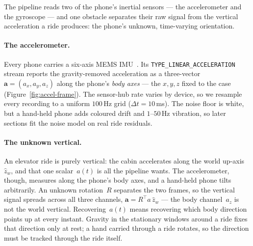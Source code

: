 \documentclass[manuscript,review,screen]{acmart}
\begin{document}
The pipeline reads two of the phone's inertial sensors --- the
accelerometer and the gyroscope --- and one obstacle separates their
raw signal from the vertical acceleration a ride produces: the phone's
unknown, time-varying orientation.

\paragraph{The accelerometer.}
Every phone carries a six-axis MEMS IMU~\cite{beeby2004mems}.  Its
\texttt{TYPE\_LINEAR\_ACCELERATION} stream reports the
gravity-removed acceleration as a three-vector
$\mathbf{a}=(a_x,a_y,a_z)$ along the phone's \emph{body axes} --- the
$x,y,z$ fixed to the case (Figure~\ref{fig:accel-frame}).  The
sensor-hub rate varies by device, so we resample every recording to
a uniform $100$\,Hz grid ($\Delta t\!=\!10$\,ms).  The noise floor
is white, but a hand-held phone adds coloured drift and
$1\text{--}50$\,Hz vibration, so later sections fit the noise model
on real ride residuals.

\paragraph{The unknown vertical.}
An elevator ride is purely vertical: the cabin accelerates along the
world up-axis~$\hat z_w$, and that one scalar~$a(t)$ is all the
pipeline wants.  The accelerometer, though, measures along the
phone's body axes, and a hand-held phone tilts arbitrarily.  An
unknown rotation~$R$ separates the two frames, so the vertical
signal spreads across all three channels,
$\mathbf{a}=R^{\!\top}\!a\,\hat z_w$ --- the body channel~$a_z$ is
not the world vertical.  Recovering~$a(t)$ means recovering which
body direction points up at every instant.  Gravity in the stationary
windows around a ride fixes that direction only at rest; a hand carried
through a ride rotates, so the direction must be tracked through the
ride itself.
\end{document}
